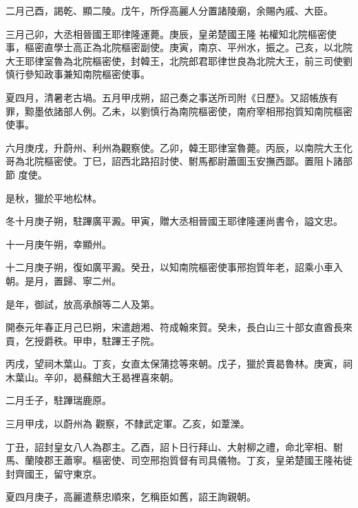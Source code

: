\begin{pinyinscope}
 二月己酉，謁乾、顯二陵。戊午，所俘高麗人分置諸陵廟，余賜內戚、大臣。



 三月己卯，大丞相晉國王耶律隆運薨。庚辰，皇弟楚國王隆
 祐權知北院樞密使事，樞密直學士高正為北院樞密副使。庚寅，南京、平州水，振之。己亥，以北院大王耶律室魯為北院樞密使，封韓王，北院郎君耶律世良為北院大王，前三司使劉慎行參知政事兼知南院樞密使事。



 夏四月，清暑老古堝。五月甲戌朔，詔己奏之事送所司附《日歷》。又詔帳族有罪，黥墨依諸部人例。乙未，以劉慎行為南院樞密使，南府宰相邢抱質知南院樞密使事。



 六月庚戌，升蔚州、利州為觀察使。乙卯，韓王耶律室魯薨。丙辰，以南院大王化哥為北院樞密使。丁巳，詔西北路招討使、駙馬都尉蕭圖玉安撫西鄙。置阻卜諸部節
 度使。



 是秋，獵於平地松林。



 冬十月庚子朔，駐蹕廣平澱。甲寅，贈大丞相晉國王耶律隆運尚書令，謚文忠。



 十一月庚午朔，幸顯州。



 十二月庚子朔，復如廣平澱。癸丑，以知南院樞密使事邢抱質年老，詔乘小車入朝。是月，置歸、寧二州。



 是年，御試，放高承顏等二人及第。



 開泰元年春正月己巳朔，宋遣趙湘、符成翰來賀。癸未，長白山三十部女直酋長來貢，乞授爵秩。甲申，駐蹕王子院。



 丙戌，望祠木葉山。丁亥，女直太保蒲捻等來朝。戊子，獵於賣曷魯林。庚寅，祠木葉山。辛卯，曷蘇館大王曷裡喜來朝。



 二月壬子，駐蹕瑞鹿原。



 三月甲戌，以蔚州為
 觀察，不隸武定軍。乙亥，如葦濼。



 丁丑，詔封皇女八人為郡主。乙酉，詔卜日行拜山、大射柳之禮，命北宰相、駙馬、蘭陵郡王蕭寧。樞密使、司空邢抱質督有司具儀物。丁亥，皇弟楚國王隆祐徙封齊國王，留守東京。



 夏四月庚子，高麗遣蔡忠順來，乞稱臣如舊，詔王詢親朝。




\end{pinyinscope}
